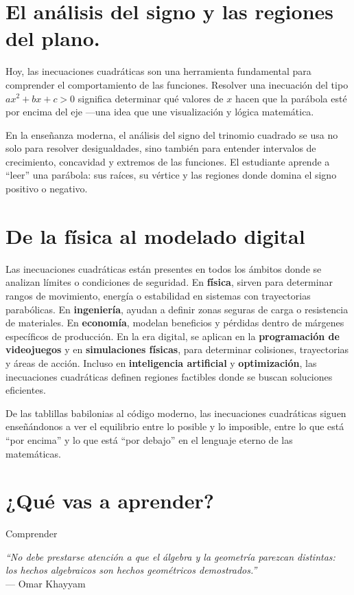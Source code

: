 \section*{El análisis del signo y las regiones del plano.}
\begin{reseñaplana}
Hoy, las inecuaciones cuadráticas son una herramienta fundamental para comprender el comportamiento de las funciones.  
Resolver una inecuación del tipo $ax^2 + bx + c > 0$ significa determinar qué valores de $x$ hacen que la parábola esté 
por encima del eje —una idea que une visualización y lógica matemática.  

En la enseñanza moderna, el análisis del signo del trinomio cuadrado se usa no solo para resolver desigualdades, 
sino también para entender intervalos de crecimiento, concavidad y extremos de las funciones.  
El estudiante aprende a “leer” una parábola: sus raíces, su vértice y las regiones donde domina el signo positivo o negativo.  
\end{reseñaplana}

\section*{De la física al modelado digital} 
\begin{reseñaplana} 
Las inecuaciones cuadráticas están presentes en todos los ámbitos donde se analizan límites o condiciones de seguridad.  
En \textbf{física}, sirven para determinar rangos de movimiento, energía o estabilidad en sistemas con trayectorias parabólicas.  
En \textbf{ingeniería}, ayudan a definir zonas seguras de carga o resistencia de materiales.  
En \textbf{economía}, modelan beneficios y pérdidas dentro de márgenes específicos de producción.  
En la era digital, se aplican en la \textbf{programación de videojuegos} y en \textbf{simulaciones físicas}, 
para determinar colisiones, trayectorias y áreas de acción.  
Incluso en \textbf{inteligencia artificial} y \textbf{optimización}, las inecuaciones cuadráticas definen regiones 
factibles donde se buscan soluciones eficientes.  

De las tablillas babilonias al código moderno, las inecuaciones cuadráticas siguen enseñándonos a ver el equilibrio 
entre lo posible y lo imposible, entre lo que está “por encima” y lo que está “por debajo” en el lenguaje eterno de las matemáticas.
\end{reseñaplana}

\section*{¿Qué vas a aprender?}
\begin{aprende}
  \item Comprender 
\end{aprende}

\vspace{1cm}
\begin{flushright}
  {\oneptup\itshape ``No debe prestarse atención a que el álgebra y la geometría parezcan distintas:\\ los hechos algebraicos son hechos geométricos demostrados.''}\\
  {\oneptup — Omar Khayyam}
\end{flushright}